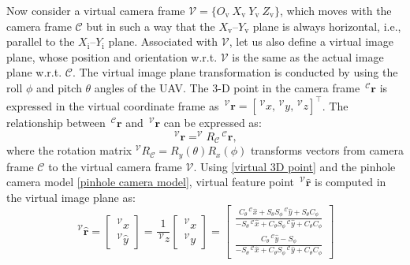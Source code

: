 \documentclass[lettersize,journal]{IEEEtran}
\begin{document}
Now consider a virtual camera frame $\mathcal{V}=\{O_{\text{v}} ~X_{\text{v}} ~Y_{\text{v}} ~Z_{\text{v}}\}$, which moves with the camera frame $\mathcal{C}$ but in such a way that the $X_{\text{v}}$--$Y_{\text{v}}$ plane is always horizontal, i.e., parallel to the $X_{\text{i}}$--$Y_{\text{i}}$ plane.
Associated with $\mathcal{V}$, let us also define a virtual image plane, whose position and orientation w.r.t. $\mathcal{V}$ is the same as the actual image plane w.r.t. $\mathcal{C}$.
The virtual image plane transformation is conducted by using the roll $\phi$ and pitch $\theta$ angles of the UAV.
The 3-D point in the camera frame $\,^\mathcal{C} \boldsymbol{r}$ is expressed in the virtual coordinate frame as $\,^\mathcal{V} \boldsymbol{r} = [\,^\mathcal{V} x, \,^\mathcal{V} y, \,^\mathcal{V} z]^{\top}$. The relationship between $\,^\mathcal{C} \boldsymbol{r}$ and $\,^\mathcal{V} \boldsymbol{r}$ can be expressed as:
\begin{equation}
\label{virtual 3D point}
    \,^\mathcal{V} \boldsymbol{r} = ^\mathcal{V}R_\mathcal{C} \,^\mathcal{C} \boldsymbol{r},
\end{equation}
where the rotation matrix $^\mathcal{V}R_\mathcal{C} = R_y(\theta) R_x(\phi)$ transforms vectors from camera frame $\mathcal{C}$ to the virtual camera frame $\mathcal{V}$.
Using \eqref{virtual 3D point} and the pinhole camera model \eqref{pinhole camera model}, virtual feature point $\,^\mathcal{V} \boldsymbol{\hat{r}}$ is computed in the virtual image plane as:
\begin{equation}
\label{virtual feature point}
    \,^\mathcal{V} \boldsymbol{\hat{r}} = \begin{bmatrix} \,^\mathcal{V} \hat{x} \\ \,^\mathcal{V} \hat{y} \end{bmatrix}
    = \frac{1}{\,^\mathcal{V} z} \begin{bmatrix} \,^\mathcal{V} x \\ \,^\mathcal{V} y\end{bmatrix} = \begin{bmatrix}
        \frac{C_\theta \,^\mathcal{C} \hat{x} + S_\theta S_\phi \,^\mathcal{C} \hat{y} + S_\theta C_\phi}{- S_\theta \,^\mathcal{C} \hat{x} + C_\theta S_\phi \,^\mathcal{C} \hat{y} + C_\theta C_\phi} \\ 
        \frac{C_\theta \,^\mathcal{C} \hat{y} - S_\phi}{- S_\theta \,^\mathcal{C} \hat{x} + C_\theta S_\phi \,^\mathcal{C} \hat{y} + C_\theta C_\phi}
    \end{bmatrix}
\end{equation}
\end{document}
